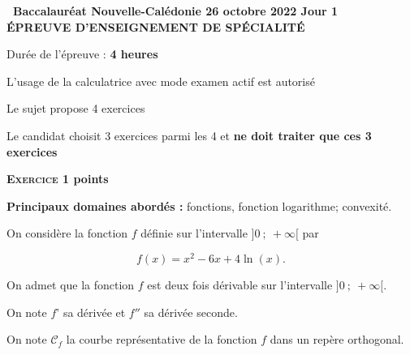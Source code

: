 \documentclass[11pt]{article}
\begin{document}
\pagestyle{fancy}
\thispagestyle{empty}

\begin{center}{\Large\textbf{\decofourleft~Baccalauréat Nouvelle-Calédonie 26 octobre 2022 Jour 1~\decofourright\\[7pt] ÉPREUVE D'ENSEIGNEMENT DE SPÉCIALITÉ }}

\bigskip

Durée de l'épreuve : \textbf{4 heures}

\medskip

L'usage de la calculatrice avec mode examen actif est autorisé

\medskip

Le sujet propose 4 exercices

Le candidat choisit 3 exercices parmi les 4 et \textbf{ne doit traiter que ces 3 exercices}
\end{center}

\bigskip

\textbf{\textsc{Exercice 1}  points\hfill}

\medskip

\textbf{Principaux domaines abordés :} fonctions, fonction logarithme; convexité.

\medskip

On considère la fonction $f$ définie sur l'intervalle $]0~;~+\infty[$ par

\[f(x) = x^2 - 6x + 4\ln (x).\]

On admet que la fonction $f$ est deux fois dérivable sur l'intervalle $]0~;~+ \infty[$.

On note $f$' sa dérivée et $f''$ sa dérivée seconde.

On note $\mathcal{C}_f$ la courbe représentative de la fonction $f$ dans un repère orthogonal.

\medskip
\end{document}
